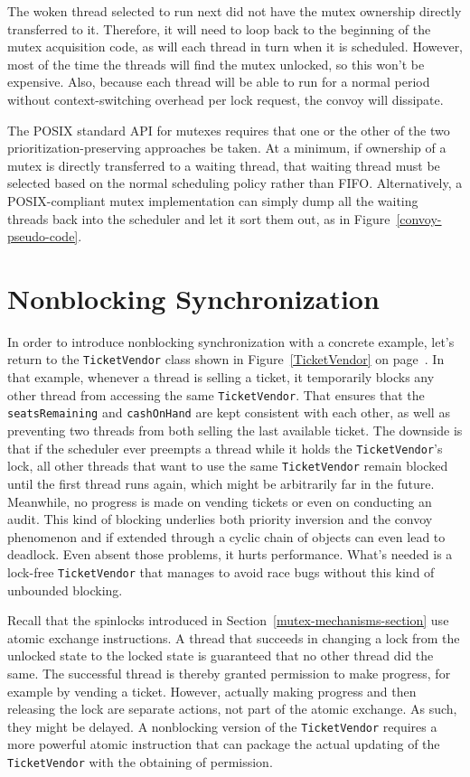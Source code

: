The woken thread selected to run next did not have the mutex ownership
directly transferred to it.  Therefore, it will need to loop back to
the beginning of the mutex acquisition code, as will each thread in
turn when it is scheduled.  However, most of the time the threads will
find the mutex unlocked, so this won't be expensive.  Also, because each
thread will be able to run for a normal period without context-switching overhead per lock request, the convoy will dissipate.

The POSIX standard API for mutexes requires that one or the other of
the two prioritization-preserving approaches be taken.  At a minimum, if ownership of a
mutex is directly transferred to a waiting thread, that waiting thread
must be selected based on the normal scheduling policy rather than
FIFO.  Alternatively, a POSIX-compliant mutex implementation can
simply dump all the waiting threads back into the scheduler and let it
sort them out, as in Figure~\ref{convoy-pseudo-code}.

\section{Nonblocking Synchronization}\label{nonblocking-synchronization-section}
In order to introduce nonblocking synchronization with a concrete example, let's return
to the \texttt{TicketVendor} class shown in Figure~\ref{TicketVendor} on page~\pageref{TicketVendor}.
In that example, whenever a thread is selling a ticket, it temporarily blocks any other
thread from accessing the same \texttt{TicketVendor}.  That ensures that the \texttt{seatsRemaining}
and \texttt{cashOnHand} are kept consistent with each other, as well as preventing two threads from both
selling the last available ticket.  The downside is that if the scheduler ever preempts a thread
while it holds the \texttt{TicketVendor}'s lock, all other threads that want to use the same \texttt{TicketVendor} remain blocked until the first thread runs again, which might be arbitrarily far in the future.  Meanwhile, no progress is made on vending tickets or even on conducting an audit.  This kind of blocking underlies both priority inversion and the convoy phenomenon and if extended through a cyclic chain of objects can even lead to deadlock.  Even absent those problems, it hurts performance.  What's needed is a lock-free \texttt{TicketVendor} that manages to avoid race bugs without this kind of unbounded blocking.

Recall that the spinlocks introduced in Section~\ref{mutex-mechanisms-section} use atomic exchange instructions.  A thread that succeeds in changing a lock from the unlocked state to the locked state is guaranteed that no other thread did the same.  The successful thread is thereby granted permission to make progress, for example by vending a ticket. However, actually making progress and then releasing the lock are separate actions, not part of the atomic exchange.  As such, they might be delayed.  A nonblocking version of the \texttt{TicketVendor} requires a more powerful atomic instruction that can package the actual updating of the \texttt{TicketVendor} with the obtaining of permission.

